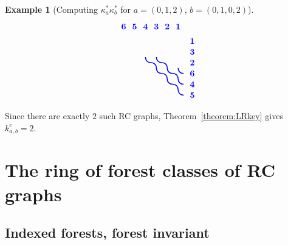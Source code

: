 \documentclass{amsart}
\theoremstyle{definition}
\newtheorem{example}[lemma]{Example}
\theoremstyle{remark}
\numberwithin{equation}{subsection}
\begin{document}
\begin{example}[Computing $\kappa_a^*\kappa_b^*$ for $a=(0,1,2)$, $b=(0,1,0,2)$]
$$\begin{tikzpicture}[scale=0.45, baseline=(current bounding box.center)]
  \draw[blue, line width=1.125pt] (4.5,3) .. controls (4.5,3.3) and (4.3,3.5) .. (4,3.5);
  \draw[blue, line width=1.125pt] (4,3.5) .. controls (3.7,3.5) and (3.5,3.7) .. (3.5,4);
  \draw[blue, line width=1.125pt] (3.5,3) .. controls (3.5,3.3) and (3.3,3.5) .. (3,3.5);
  \draw[blue, line width=1.125pt] (3,3.5) .. controls (2.7,3.5) and (2.5,3.7) .. (2.5,4);
  \draw[blue, line width=1.125pt] (6,2.5) .. controls (5.7,2.5) and (5.5,2.7) .. (5.5,3);
  \draw[blue, line width=1.125pt] (5.5,2) .. controls (5.5,2.3) and (5.3,2.5) .. (5,2.5);
  \draw[blue, line width=1.125pt] (5,2.5) .. controls (4.7,2.5) and (4.5,2.7) .. (4.5,3);
  \draw[blue, line width=1.125pt] (4.5,2) .. controls (4.5,2.3) and (4.3,2.5) .. (4,2.5);
  \draw[blue, line width=1.125pt] (4,2.5) .. controls (3.7,2.5) and (3.5,2.7) .. (3.5,3);
  \draw[blue, line width=1.125pt] (6,1.5) .. controls (5.7,1.5) and (5.5,1.7) .. (5.5,2);
  \draw[blue, line width=1.125pt] (5.5,1) .. controls (5.5,1.3) and (5.3,1.5) .. (5,1.5);
  \draw[blue, line width=1.125pt] (5,1.5) .. controls (4.7,1.5) and (4.5,1.7) .. (4.5,2);
  \draw[blue, line width=1.125pt] (6,0.5) .. controls (5.7,0.5) and (5.5,0.7) .. (5.5,1);
  \node[font=\bfseries, text=blue, anchor=south] at (5.5,6.3) {1};
  \node[font=\bfseries, text=blue, anchor=south] at (4.5,6.3) {2};
  \node[font=\bfseries, text=blue, anchor=south] at (3.5,6.3) {3};
  \node[font=\bfseries, text=blue, anchor=south] at (2.5,6.3) {4};
  \node[font=\bfseries, text=blue, anchor=south] at (1.5,6.3) {5};
  \node[font=\bfseries, text=blue, anchor=south] at (0.5,6.3) {6};
  \node[font=\bfseries, text=blue, anchor=west] at (6.3,5.5) {1};
  \node[font=\bfseries, text=blue, anchor=west] at (6.3,4.5) {3};
  \node[font=\bfseries, text=blue, anchor=west] at (6.3,3.5) {2};
  \node[font=\bfseries, text=blue, anchor=west] at (6.3,2.5) {6};
  \node[font=\bfseries, text=blue, anchor=west] at (6.3,1.5) {4};
  \node[font=\bfseries, text=blue, anchor=west] at (6.3,0.5) {5};
\end{tikzpicture}
$$

Since there are exactly $2$ such RC graphs, Theorem~\ref{theorem:LRkey} gives $k_{a,b}^c = 2$.
\end{example}



\section{The ring of forest classes of RC graphs}

\subsection{Indexed forests, forest invariant}
\end{document}
